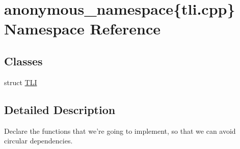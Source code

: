 \hypertarget{namespaceanonymous__namespace_02tli_8cpp_03}{\section{anonymous\-\_\-namespace\{tli.\-cpp\} Namespace Reference}
\label{namespaceanonymous__namespace_02tli_8cpp_03}
}
\subsection*{Classes}
\begin{DoxyCompactItemize}
\item 
struct \hyperlink{structanonymous__namespace_02tli_8cpp_03_1_1TLI}{T\-L\-I}
\end{DoxyCompactItemize}


\subsection{Detailed Description}
Declare the functions that we're going to implement, so that we can avoid circular dependencies. 